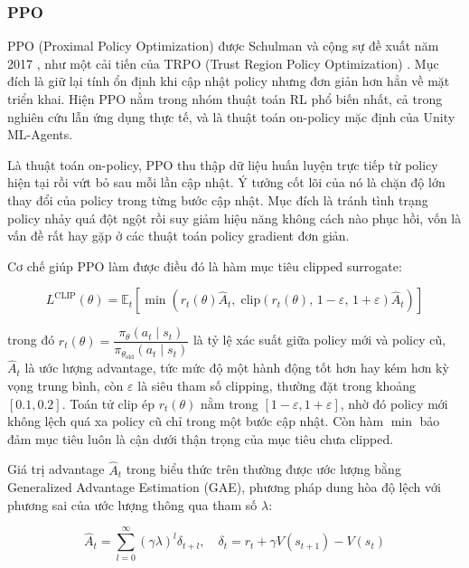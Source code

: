 \subsubsection{PPO}
\label{sub:ppo}
\indent PPO (Proximal Policy Optimization) được Schulman và cộng sự đề xuất năm 2017
\cite{schulman2017proximal}, như một cải tiến của TRPO (Trust Region Policy Optimization)
\cite{schulman2015trust}. Mục đích là giữ lại tính ổn định khi cập nhật policy nhưng đơn
giản hơn hẳn về mặt triển khai. Hiện PPO nằm trong nhóm thuật toán RL phổ biến nhất, cả
trong nghiên cứu lẫn ứng dụng thực tế, và là thuật toán on-policy mặc định của Unity
ML-Agents.

\indent Là thuật toán on-policy, PPO thu thập dữ liệu huấn luyện trực tiếp từ policy hiện
tại rồi vứt bỏ sau mỗi lần cập nhật. Ý tưởng cốt lõi của nó là chặn độ lớn thay đổi của
policy trong từng bước cập nhật. Mục đích là tránh tình trạng policy nhảy quá đột ngột rồi
suy giảm hiệu năng không cách nào phục hồi, vốn là vấn đề rất hay gặp ở các thuật toán
policy gradient đơn giản.

\indent Cơ chế giúp PPO làm được điều đó là hàm mục tiêu clipped surrogate:

\begin{equation}
    L^{\text{CLIP}}(\theta) = \mathbb{E}_t \left[
        \min \left(
            r_t(\theta) \hat{A}_t,\;
            \text{clip}\!\left(r_t(\theta),\, 1-\varepsilon,\, 1+\varepsilon\right)
            \hat{A}_t
        \right)
    \right]
\end{equation}

\noindent trong đó $r_t(\theta) = \dfrac{\pi_\theta(a_t \mid s_t)}{\pi_{\theta_\text{old}}(a_t \mid s_t)}$
là tỷ lệ xác suất giữa policy mới và policy cũ, $\hat{A}_t$ là ước lượng advantage, tức mức độ
một hành động tốt hơn hay kém hơn kỳ vọng trung bình, còn $\varepsilon$ là siêu
tham số clipping, thường đặt trong khoảng $[0.1, 0.2]$. Toán tử $\text{clip}$ ép
$r_t(\theta)$ nằm trong $[1-\varepsilon, 1+\varepsilon]$, nhờ đó policy mới không lệch quá
xa policy cũ chỉ trong một bước cập nhật. Còn hàm $\min$ bảo đảm mục tiêu luôn là cận dưới
thận trọng của mục tiêu chưa clipped.

\indent Giá trị advantage $\hat{A}_t$ trong biểu thức trên thường được ước lượng bằng
Generalized Advantage Estimation (GAE), phương pháp dung hòa độ lệch với phương sai của
ước lượng thông qua tham số $\lambda$:

\begin{equation}
    \hat{A}_t = \sum_{l=0}^{\infty} (\gamma\lambda)^l \delta_{t+l}, \quad
    \delta_t = r_t + \gamma V(s_{t+1}) - V(s_t)
\end{equation}

